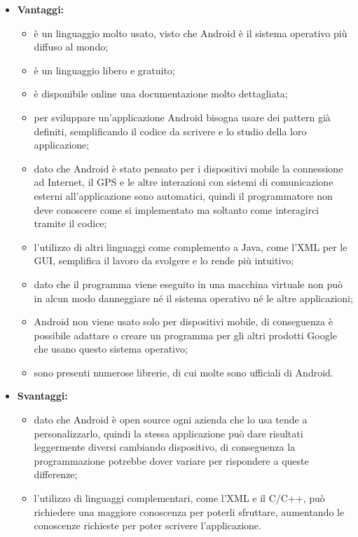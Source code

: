 	\begin{itemize}
		\item \textbf{Vantaggi:}
			\begin{itemize}
				\item è un linguaggio molto usato, visto che Android è il sistema operativo più diffuso al mondo;
				\item è un linguaggio libero e gratuito;
				\item è disponibile online una documentazione molto dettagliata;
				\item per sviluppare un'applicazione Android bisogna usare dei pattern già definiti, semplificando il codice da scrivere e lo studio della loro applicazione;
				\item dato che Android è stato pensato per i dispositivi mobile la connessione ad Internet, il GPS e le altre interazioni con sistemi di comunicazione esterni all'applicazione sono automatici, quindi il programmatore non deve conoscere come si implementato ma soltanto come interagirci tramite il codice;
				\item l'utilizzo di altri linguaggi come complemento a Java, come l'XML per le GUI, semplifica il lavoro da svolgere e lo rende più intuitivo;
				\item dato che il programma viene eseguito in una macchina virtuale non può in alcun modo danneggiare né il sistema operativo né le altre applicazioni;
				\item Android non viene usato solo per dispositivi mobile, di conseguenza è possibile adattare o creare un programma per gli altri prodotti Google che usano questo sistema operativo;
				\item sono presenti numerose librerie, di cui molte sono ufficiali di Android.
			\end{itemize}
		\item \textbf{Svantaggi:}
			\begin{itemize}
				\item dato che Android è open source ogni azienda che lo usa tende a personalizzarlo, quindi la stessa applicazione può dare risultati leggermente diversi cambiando dispositivo, di conseguenza la programmazione potrebbe dover variare per rispondere a queste differenze;
				\item l'utilizzo di linguaggi complementari, come l'XML e il C/C++, può richiedere una maggiore conoscenza per poterli sfruttare, aumentando le conoscenze richieste per poter scrivere l'applicazione.
			\end{itemize}
	\end{itemize}
	
